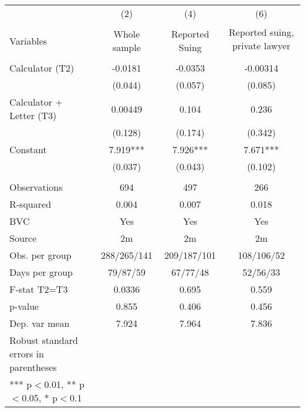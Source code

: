 
  \centering
    \begin{tabular}{lrrr}
    \midrule
    \midrule
          & \multicolumn{1}{c}{(2)} & \multicolumn{1}{c}{(4)} & \multicolumn{1}{c}{(6)} \\
          &       &       & \multicolumn{1}{c}{\multirow{2}[1]{*}{Reported suing, private lawyer}} \\
    Variables & \multicolumn{1}{c}{Whole sample} & \multicolumn{1}{c}{Reported Suing} &  \\
    \midrule
          &       &       &  \\
    Calculator (T2) & \multicolumn{1}{c}{-0.0181} & \multicolumn{1}{c}{-0.0353} & \multicolumn{1}{c}{-0.00314} \\
          & \multicolumn{1}{c}{(0.044)} & \multicolumn{1}{c}{(0.057)} & \multicolumn{1}{c}{(0.085)} \\
    Calculator + Letter (T3) & \multicolumn{1}{c}{0.00449} & \multicolumn{1}{c}{0.104} & \multicolumn{1}{c}{0.236} \\
          & \multicolumn{1}{c}{(0.128)} & \multicolumn{1}{c}{(0.174)} & \multicolumn{1}{c}{(0.342)} \\
    Constant & \multicolumn{1}{c}{7.919***} & \multicolumn{1}{c}{7.926***} & \multicolumn{1}{c}{7.671***} \\
          & \multicolumn{1}{c}{(0.037)} & \multicolumn{1}{c}{(0.043)} & \multicolumn{1}{c}{(0.102)} \\
          &       &       &  \\
    \midrule
    Observations & \multicolumn{1}{c}{694} & \multicolumn{1}{c}{497} & \multicolumn{1}{c}{266} \\
    R-squared & \multicolumn{1}{c}{0.004} & \multicolumn{1}{c}{0.007} & \multicolumn{1}{c}{0.018} \\
    BVC   & \multicolumn{1}{c}{Yes} & \multicolumn{1}{c}{Yes} & \multicolumn{1}{c}{Yes} \\
    Source & \multicolumn{1}{c}{2m} & \multicolumn{1}{c}{2m} & \multicolumn{1}{c}{2m} \\
    Obs. per group & \multicolumn{1}{c}{288/265/141} & \multicolumn{1}{c}{209/187/101} & \multicolumn{1}{c}{108/106/52} \\
    Days per group & \multicolumn{1}{c}{79/87/59} & \multicolumn{1}{c}{67/77/48} & \multicolumn{1}{c}{52/56/33} \\
    F-stat T2=T3 & \multicolumn{1}{c}{0.0336} & \multicolumn{1}{c}{0.695} & \multicolumn{1}{c}{0.559} \\
    p-value & \multicolumn{1}{c}{0.855} & \multicolumn{1}{c}{0.406} & \multicolumn{1}{c}{0.456} \\
    Dep. var mean & \multicolumn{1}{c}{7.924} & \multicolumn{1}{c}{7.964} & \multicolumn{1}{c}{7.836} \\
    \midrule
    \midrule
    Robust standard errors in parentheses &       &       &  \\
    *** p$<$0.01, ** p$<$0.05, * p$<$0.1 &       &       &  \\
    \end{tabular}%

